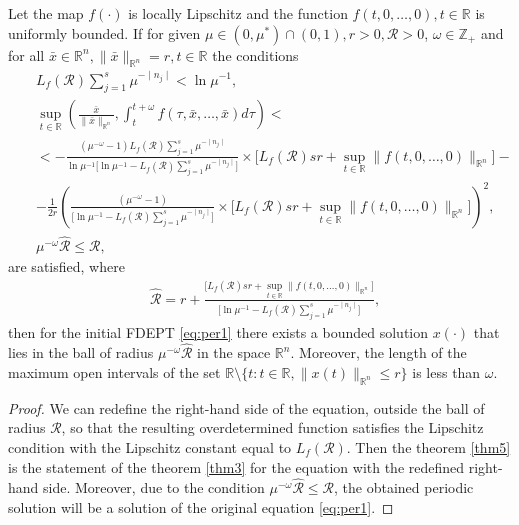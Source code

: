 \documentclass[
11pt,%
tightenlines,%
twoside,%
onecolumn,%
nofloats,%
nobibnotes,%
nofootinbib,%
superscriptaddress,%
noshowpacs,%
centertags,aps]%
{revtex4}
\begin{document}
\begin{theorem}\label{thm5}
Let the map $f(\cdot)$ is locally Lipschitz and the function $f(t,0,\ldots,0), t\in\mathbb R$ is uniformly bounded. If for given $\mu\in(0,\mu^*)\cap(0,1), r>0, \mathcal R>0$, $\omega \in \mathbb Z_+$ and for all $\bar{x}\in \mathbb R^n, \|\bar{x}\|_{\mathbb R^n}=r, t\in\mathbb R$ the conditions
\begin{eqnarray*}
&&L_f(\mathcal R)\sum_{j=1}^{s}\mu^{-\mid n_j \mid} <\ln \mu^{-1},\\
&&\sup_{t\in \mathbb R}\left(\frac{\bar{x}}{\|\bar{x}\|_{\mathbb R^n}},\int_t^{t+\omega} f(\tau,\bar{x},\ldots,\bar{x})d\tau\right)< \\
&&< - \frac{\left(\mu^{-\omega}-1 \right)L_f(\mathcal R)\sum_{j=1}^{s}\mu^{-\mid n_j \mid}}{\ln \mu^{-1}\big[\ln \mu^{-1}-L_f(\mathcal R)\sum_{j=1}^{s}\mu^{-\mid n_j \mid}\big]}\times \big[L_f(\mathcal R) sr +\sup_{t\in \mathbb R}\|f(t,0,\ldots,0)\|_{\mathbb R^n} \big] -\\
&&-\frac{1}{2r} \left(\frac{\left(\mu^{-\omega}-1 \right)}{\big[\ln \mu^{-1}-L_f(\mathcal R)\sum_{j=1}^{s}\mu^{-\mid n_j \mid}\big]}\times \big[L_f(\mathcal R) sr +\sup_{t\in \mathbb R}\|f(t,0,\ldots,0)\|_{\mathbb R^n} \big]\right)^2,\\
&&\mu^{-\omega}\hat{\mathcal R}\leq {\mathcal R},
\end{eqnarray*}
are satisfied, where
\begin{eqnarray*}
&\displaystyle{\hat{\mathcal R}=r+\frac{\big[L_f(\mathcal R)sr+\sup_{t\in \mathbb R}\|f(t,0,\ldots,0)\|_{\mathbb R^n}\big]}{\big[\ln \mu^{-1}-L_f(\mathcal R)\sum_{j=1}^{s}\mu^{-\mid n_j \mid}\big]}},
\end{eqnarray*}
then for the initial FDEPT \eqref{eq:per1} there exists a bounded solution $x(\cdot)$ that lies in the ball of radius $\mu^{-\omega}\hat{\mathcal R}$ in the space $\mathbb R^n$. Moreover, the length of the maximum open intervals of the set $\mathbb R\setminus \{t: {t}\in \mathbb R, \|x(t)\|_{\mathbb R^n}\leq r\}$ is less than $\omega$.
\end{theorem}
\begin{proof}
We can redefine the right-hand side of the equation, outside the ball of radius $\mathcal R$, so that the resulting overdetermined function satisfies the Lipschitz condition with the Lipschitz constant equal to $L_f(\mathcal R)$. Then the theorem \ref{thm5} is the statement of the theorem \ref{thm3} for the equation with the redefined right-hand side.  Moreover, due to the condition $\mu^{-\omega}\hat{\mathcal R}\leq {\mathcal R}$, the obtained periodic solution will be a solution of the original equation \eqref{eq:per1}.
\end{proof}
\end{document}
